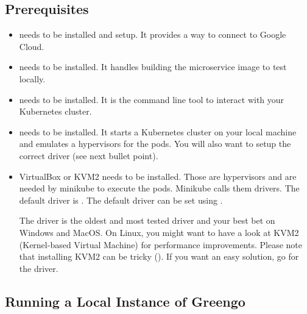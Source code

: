 \documentclass[letterpaper,10pt,english]{sphinxmanual}
\begin{document}
\subsection{Prerequisites}
\label{\detokenize{deployments:prerequisites}}\begin{itemize}
\item {} 
 needs to be installed and setup.
It provides a way to connect to Google Cloud.

\item {} 
 needs to be installed.
It handles building the microservice image to test locally.

\item {} 
 needs to be installed.
It is the command line tool to interact with your Kubernetes cluster.

\item {} 
 needs to be installed.
It starts a Kubernetes cluster on your local machine and emulates a hypervisors for the pods.
You will also want to setup the correct driver (see next bullet point).

\item {} 
VirtualBox or KVM2 needs to be installed.
Those are hypervisors and are needed by minikube to execute the pods.
Minikube calls them drivers.
The default driver is .
The default driver can be set using .

The  driver is the oldest and most tested driver and your best bet on Windows and MacOS.
On Linux, you might want to have a look at KVM2 (Kernel-based Virtual Machine) for performance improvements.
Please note that installing KVM2 can be tricky ().
If you want an easy solution, go for the  driver.

\end{itemize}


\subsection{Running a Local Instance of Greengo}
\label{\detokenize{deployments:running-a-local-instance-of-greengo}}
\end{document}
